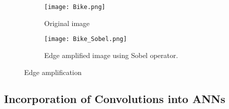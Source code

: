 \begin{figure}
\centering
\begin{subfigure}{.5\textwidth}
  \centering
  \texttt{[image: Bike.png]}
  \caption{Original image}
  \label{fig:sub1}
\end{subfigure}%
\begin{subfigure}{.5\textwidth}
  \centering
  \texttt{[image: Bike\_Sobel.png]}
  \caption{Edge amplified image using Sobel operator.}
  \label{fig:sub2}
\end{subfigure}
\caption{Edge amplification}
\label{fig:Sobel}
\end{figure}

\subsection{Incorporation of Convolutions into ANNs}
\label{sec:CNN}

